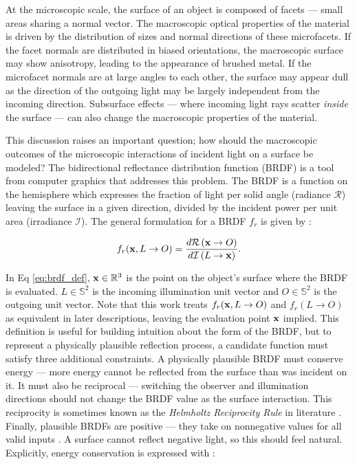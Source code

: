 At the microscopic scale, the surface of an object is composed of facets ---  small areas sharing a normal vector. The macroscopic optical properties of the material is driven by the distribution of sizes and normal directions of these microfacets. If the facet normals are distributed in biased orientations, the macroscopic surface may show anisotropy, leading to the appearance of brushed metal. If the microfacet normals are at large angles to each other, the surface may appear dull as the direction of the outgoing light may be largely independent from the incoming direction. Subsurface effects ---  where incoming light rays scatter \textit{inside} the surface --- can also change the macroscopic properties of the material. 

This discussion raises an important question; how should the macroscopic outcomes of the microscopic interactions of incident light on a surface be modeled? The bidirectional reflectance distribution function (BRDF) is a tool from computer graphics that addresses this problem. The BRDF is a function on the hemisphere which expresses the fraction of light per solid angle (radiance $\mathcal{R}$) leaving the surface in a given direction, divided by the incident power per unit area (irradiance $\mathcal{I}$). The general formulation for a BRDF $f_r$ is given by \cite{duvenhage2013}:

\begin{equation} \label{eq:brdf_def}
    f_r(\mathbf{x}, L \rightarrow O) = \frac{d\mathcal{R}\left(\mathbf{x} \rightarrow O\right)}{d\mathcal{I}\left(L \rightarrow \mathbf{x}\right)}.
\end{equation}

In Eq \ref{eq:brdf_def}, $\mathbf{x} \in \mathbb{R}^3$ is the point on the object's surface where the BRDF is evaluated. $L \in \mathbb{S}^2$ is the incoming illumination unit vector and $O \in \mathbb{S}^2$ is the outgoing unit vector. Note that this work treats $f_r(\mathbf{x}, L \rightarrow O)$ and $f_r(L \rightarrow O)$ as equivalent in later descriptions, leaving the evaluation point $\mathbf{x}$ implied. This definition is useful for building intuition about the form of the BRDF, but to represent a physically plausible reflection process, a candidate function must satisfy three additional constraints. A physically plausible BRDF must conserve energy --- more energy cannot be reflected from the surface than was incident on it. It must also be reciprocal --- switching the observer and illumination directions should not change the BRDF value as the surface interaction. This reciprocity is sometimes known as the \textit{Helmholtz Reciprocity Rule} in literature \cite{montes2012}. Finally, plausible BRDFs are positive --- they take on nonnegative values for all valid inputs \cite{montes2012}. A surface cannot reflect negative light, so this should feel natural. Explicitly, energy conservation is expressed with \cite{montes2012}:


